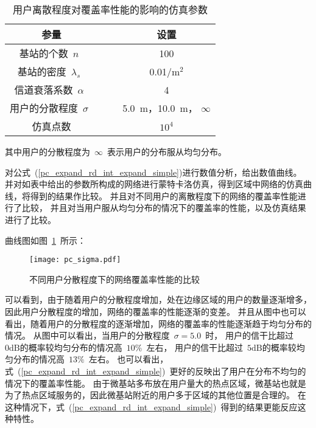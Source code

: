 \begin{table}[htbp]
\caption{用户离散程度对覆盖率性能的影响的仿真参数}
\label{pc_sigma_sim_para}
\vspace{0.5em}\centering\wuhao
\begin{tabular}{cccc}
\toprule[1.5pt]
参量 & & & 设置 \\
\midrule[0.5pt]
基站的个数~$n$~ & & &  100\\
基站的密度~$\lambda_s$~ & & &  0.01/${\mathrm{m}^2}$\\
信道衰落系数~$\alpha$~  & & &  4\\
用户的分散程度~$\sigma$~ & & & 5.0~$\mathrm{m}$，10.0~$\mathrm{m}$， $\infty$  \\
仿真点数 & & & $10^{4}$ \\
\bottomrule[1.5pt]
\end{tabular}
\end{table}
其中用户的分散程度为~$\infty$~表示用户的分布服从均匀分布。

对公式~(\ref{pc_expand_rd_int_expand_simple})进行数值分析，给出数值曲线。
并对如表中给出的参数所构成的网络进行蒙特卡洛仿真，得到区域中网络的仿真曲线，将得到的结果作比较。
并且对不同用户的离散程度下的网络的覆盖率性能进行了比较， 并且对当用户服从均匀分布的情况下的覆盖率的性能，以及仿真结果进行了比较。

曲线图如图~\ref{pc_sigma_graph}~所示：
\begin{figure}[htbp]
\centering
\texttt{[image: pc\_sigma.pdf]}
\caption{不同用户分散程度下的网络覆盖率性能的比较}\vspace{-0.5em}
\label{pc_sigma_graph}
\end{figure}

可以看到，由于随着用户的分散程度增加，处在边缘区域的用户的数量逐渐增多，因此用户分散程度的增加，网络的覆盖率的性能逐渐的变差。
并且从图中也可以看出，随着用户的分散程度的逐渐增加，网络的覆盖率的性能逐渐趋于均匀分布的情况。
从图中可以看出，当用户的分散程度~$\sigma=5.0$~时，
用户的信干比超过~$0\mathrm{dB}$的概率较均匀分布的情况高~$10\%$~左右，
用户的信干比超过~$5\mathrm{dB}$的概率较均匀分布的情况高~$13\%$~左右。
也可以看出，式~(\ref{pc_expand_rd_int_expand_simple})~更好的反映出了用户在分布不均匀的情况下的覆盖率性能。
由于微基站多布放在用户量大的热点区域，微基站也就是为了热点区域服务的，因此微基站附近的用户多于区域的其他位置是合理的。
在这种情况下，式~(\ref{pc_expand_rd_int_expand_simple})~得到的结果更能反应这种特性。



